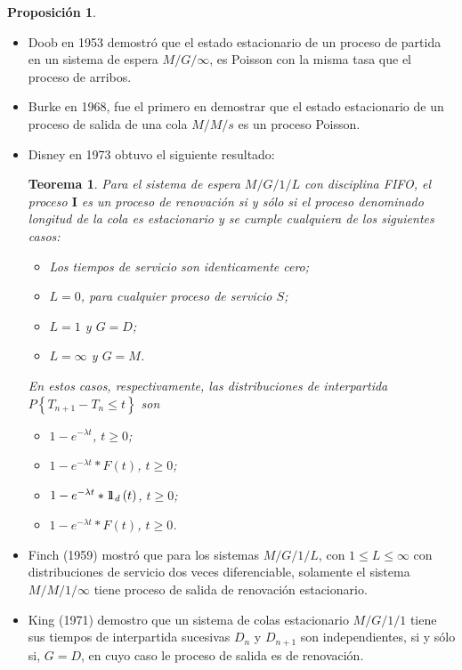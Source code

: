 \documentclass{article}
\newtheorem{Teo}{Teorema}[section]
\newtheorem{Prop}{Proposición}[section]
\newcommand{\indora}{\mbox{$1$\hspace{-0.8ex}$1$}}
\numberwithin{equation}{section}
\begin{document}
{\begin{Prop}
\end{Prop}


\begin{itemize}
\item Doob en 1953 demostr\'o que el estado estacionario de un proceso de partida en un sistema de espera $M/G/\infty$, es Poisson con la misma tasa que el proceso de arribos.

\item Burke en 1968, fue el primero en demostrar que el estado estacionario de un proceso de salida de una cola $M/M/s$ es un proceso Poisson.

\item Disney en 1973 obtuvo el siguiente resultado:

\begin{Teo}
Para el sistema de espera $M/G/1/L$ con disciplina FIFO, el proceso $\textbf{I}$ es un proceso de renovaci\'on si y s\'olo si el proceso denominado longitud de la cola es estacionario y se cumple cualquiera de los siguientes casos:

\begin{itemize}
\item[a)] Los tiempos de servicio son identicamente cero;
\item[b)] $L=0$, para cualquier proceso de servicio $S$;
\item[c)] $L=1$ y $G=D$;
\item[d)] $L=\infty$ y $G=M$.
\end{itemize}
En estos casos, respectivamente, las distribuciones de interpartida $P\left\{T_{n+1}-T_{n}\leq t\right\}$ son


\begin{itemize}
\item[a)] $1-e^{-\lambda t}$, $t\geq0$;
\item[b)] $1-e^{-\lambda t}*F\left(t\right)$, $t\geq0$;
\item[c)] $1-e^{-\lambda t}*\indora_{d}\left(t\right)$, $t\geq0$;
\item[d)] $1-e^{-\lambda t}*F\left(t\right)$, $t\geq0$.
\end{itemize}
\end{Teo}


\item Finch (1959) mostr\'o que para los sistemas $M/G/1/L$, con $1\leq L\leq \infty$ con distribuciones de servicio dos veces diferenciable, solamente el sistema $M/M/1/\infty$ tiene proceso de salida de renovaci\'on estacionario.

\item King (1971) demostro que un sistema de colas estacionario $M/G/1/1$ tiene sus tiempos de interpartida sucesivas $D_{n}$ y $D_{n+1}$ son independientes, si y s\'olo si, $G=D$, en cuyo caso le proceso de salida es de renovaci\'on.


\end{itemize}}
\end{document}
